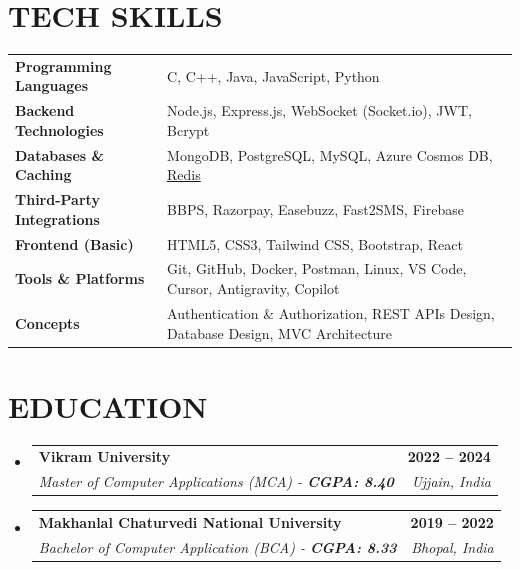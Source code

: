 \documentclass[letterpaper,11pt]{article}
\makeatletter
\newcommand{\resumeSubheading}[4]{
  \vspace{-2pt}\item
  \begin{tabular*}{1.0\textwidth}[t]{l@{\extracolsep{\fill}}r}
    \textbf{\large#1} & \textbf{\small #2} \\
    \textit{\large#3} & \textit{\small #4} \\
  \end{tabular*}\vspace{-7pt}
}
\newcommand{\resumeSubHeadingListStart}{\begin{itemize}[leftmargin=0.0in, label={}]}
\newcommand{\resumeSubHeadingListEnd}{\end{itemize}}
\makeatother
\begin{document}
\section{TECH SKILLS}
\begin{tabularx}{\textwidth}{l @{\hspace{3em}} X}
  \textbf{Programming Languages} & C, C++, Java, JavaScript, Python \\
  \textbf{Backend Technologies} & Node.js, Express.js, WebSocket (Socket.io), JWT, Bcrypt \\
  \textbf{Databases \& Caching} & MongoDB, PostgreSQL, MySQL, Azure Cosmos DB, \href{https://youtu.be/Vx2zPMPvmug}{Redis} \\
  \textbf{Third-Party Integrations} & BBPS, Razorpay, Easebuzz, Fast2SMS, Firebase \\
  \textbf{Frontend (Basic)} & HTML5, CSS3, Tailwind CSS, Bootstrap, React \\
  \textbf{Tools \& Platforms} & Git, GitHub, Docker, Postman, Linux, VS Code, Cursor, Antigravity, Copilot \\
  \textbf{Concepts} & Authentication \& Authorization, REST APIs Design, Database Design, MVC Architecture
\end{tabularx}



\section{EDUCATION}
\resumeSubHeadingListStart
  \resumeSubheading
    {Vikram University}{2022 -- 2024}
    {Master of Computer Applications (MCA) - \textbf{CGPA: 8.40}}{Ujjain, India}

  \resumeSubheading
    {Makhanlal Chaturvedi National University}{2019 -- 2022}
    {Bachelor of Computer Application (BCA) - \textbf{CGPA: 8.33}}{Bhopal, India}
\resumeSubHeadingListEnd
\end{document}
